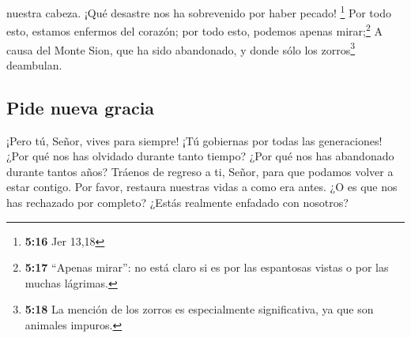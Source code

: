 nuestra cabeza. ¡Qué desastre nos ha sobrevenido por haber pecado!
\footnote{\textbf{5:16} Jer 13,18}  Por todo esto,
estamos enfermos del corazón; por todo esto, podemos apenas
mirar;\footnote{\textbf{5:17} ``Apenas mirar'': no está claro si es por
  las espantosas vistas o por las muchas lágrimas.}  A
causa del Monte Sion, que ha sido abandonado, y donde sólo los
zorros\footnote{\textbf{5:18} La mención de los zorros es especialmente
  significativa, ya que son animales impuros.} deambulan.

\hypertarget{pide-nueva-gracia}{%
\subsection{Pide nueva gracia}\label{pide-nueva-gracia}}

 ¡Pero tú, Señor, vives para siempre! ¡Tú gobiernas por
todas las generaciones!  ¿Por qué nos has olvidado
durante tanto tiempo? ¿Por qué nos has abandonado durante tantos años?
 Tráenos de regreso a ti, Señor, para que podamos volver
a estar contigo. Por favor, restaura nuestras vidas a como era antes.
 ¿O es que nos has rechazado por completo? ¿Estás
realmente enfadado con nosotros?
